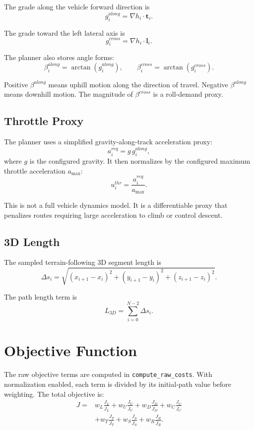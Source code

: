 \documentclass[11pt]{article}
\begin{document}
The grade along the vehicle forward direction is
\[
  g^{along}_i = \nabla h_i \cdot \mathbf{t}_i.
\]

The grade toward the left lateral axis is
\[
  g^{cross}_i = \nabla h_i \cdot \mathbf{l}_i.
\]

The planner also stores angle forms:
\[
  \beta^{along}_i = \arctan(g^{along}_i),
  \qquad
  \beta^{cross}_i = \arctan(g^{cross}_i).
\]

Positive \(\beta^{along}\) means uphill motion along the direction of travel. Negative \(\beta^{along}\) means downhill motion. The magnitude of \(\beta^{cross}\) is a roll-demand proxy.

\subsection{Throttle Proxy}

The planner uses a simplified gravity-along-track acceleration proxy:
\[
  a^{req}_i = g\,g^{along}_i,
\]
where \(g\) is the configured gravity. It then normalizes by the configured maximum throttle acceleration \(a_{\max}\):
\[
  u^{thr}_i = \frac{a^{req}_i}{a_{\max}}.
\]

This is not a full vehicle dynamics model. It is a differentiable proxy that penalizes routes requiring large acceleration to climb or control descent.

\subsection{3D Length}

The sampled terrain-following 3D segment length is
\[
  \Delta s_i =
  \sqrt{(x_{i+1}-x_i)^2+(y_{i+1}-y_i)^2+(z_{i+1}-z_i)^2}.
\]

The path length term is
\[
  L_{3D} = \sum_{i=0}^{N-2}\Delta s_i.
\]

\section{Objective Function}

The raw objective terms are computed in \texttt{compute\_raw\_costs}. With normalization enabled, each term is divided by its initial-path value before weighting. The total objective is:
\[
\begin{aligned}
  J ={}&
  w_L \frac{J_L}{\bar{J}_L}
  + w_U \frac{J_U}{\bar{J}_U}
  + w_D \frac{J_D}{\bar{J}_D}
  + w_C \frac{J_C}{\bar{J}_C} \\
  &+ w_T \frac{J_T}{\bar{J}_T}
  + w_S \frac{J_S}{\bar{J}_S}
  + w_R \frac{J_R}{\bar{J}_R}.
\end{aligned}
\]
\end{document}
